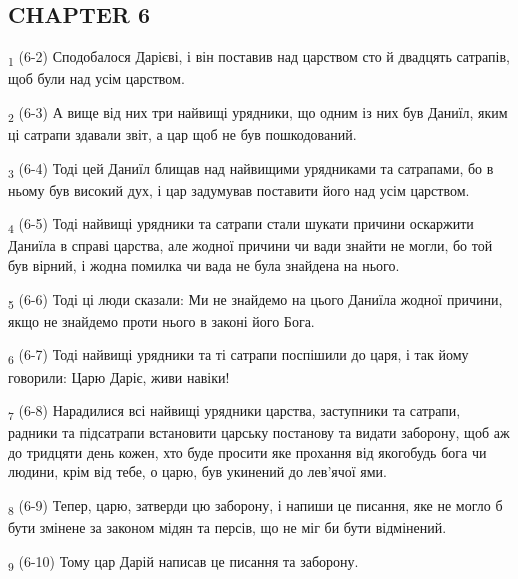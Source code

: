 \subsection{CHAPTER 6}
\begin{tcolorbox}
\textsubscript{1} (6-2) Сподобалося Дарієві, і він поставив над царством сто й двадцять сатрапів, щоб були над усім царством.
\end{tcolorbox}
\begin{tcolorbox}
\textsubscript{2} (6-3) А вище від них три найвищі урядники, що одним із них був Даниїл, яким ці сатрапи здавали звіт, а цар щоб не був пошкодований.
\end{tcolorbox}
\begin{tcolorbox}
\textsubscript{3} (6-4) Тоді цей Даниїл блищав над найвищими урядниками та сатрапами, бо в ньому був високий дух, і цар задумував поставити його над усім царством.
\end{tcolorbox}
\begin{tcolorbox}
\textsubscript{4} (6-5) Тоді найвищі урядники та сатрапи стали шукати причини оскаржити Даниїла в справі царства, але жодної причини чи вади знайти не могли, бо той був вірний, і жодна помилка чи вада не була знайдена на нього.
\end{tcolorbox}
\begin{tcolorbox}
\textsubscript{5} (6-6) Тоді ці люди сказали: Ми не знайдемо на цього Даниїла жодної причини, якщо не знайдемо проти нього в законі його Бога.
\end{tcolorbox}
\begin{tcolorbox}
\textsubscript{6} (6-7) Тоді найвищі урядники та ті сатрапи поспішили до царя, і так йому говорили: Царю Даріє, живи навіки!
\end{tcolorbox}
\begin{tcolorbox}
\textsubscript{7} (6-8) Нарадилися всі найвищі урядники царства, заступники та сатрапи, радники та підсатрапи встановити царську постанову та видати заборону, щоб аж до тридцяти день кожен, хто буде просити яке прохання від якогобудь бога чи людини, крім від тебе, о царю, був укинений до лев'ячої ями.
\end{tcolorbox}
\begin{tcolorbox}
\textsubscript{8} (6-9) Тепер, царю, затверди цю заборону, і напиши це писання, яке не могло б бути змінене за законом мідян та персів, що не міг би бути відмінений.
\end{tcolorbox}
\begin{tcolorbox}
\textsubscript{9} (6-10) Тому цар Дарій написав це писання та заборону.
\end{tcolorbox}
